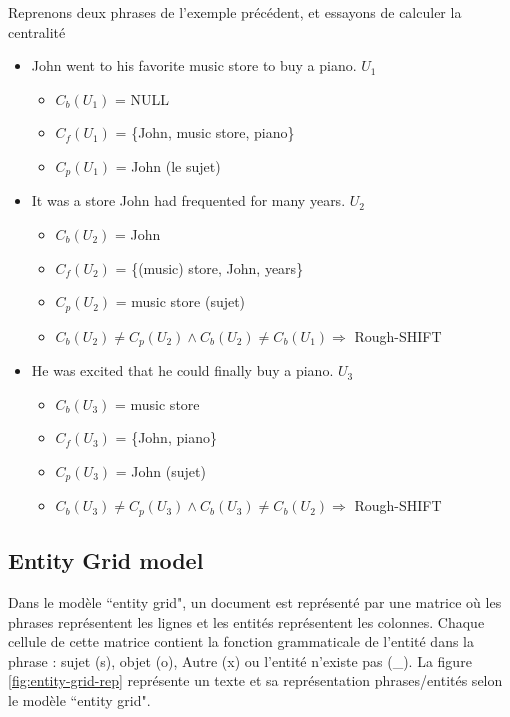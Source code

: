 \documentclass{KodeBook}
\begin{document}
Reprenons deux phrases de l'exemple précédent, et essayons de calculer la centralité
\begin{itemize}
	\item John went to his favorite music store to buy a piano. $U_1$
	\begin{itemize}
		\item $C_b(U_1)$ = NULL
		\item $C_f(U_1)$ = \{John, music store, piano\}
		\item $C_p(U_1)$ = John (le sujet)
	\end{itemize}
	\item It was a store John had frequented for many years. $U_2$
	\begin{itemize}
		\item $C_b(U_2)$ = John
		\item $C_f(U_2)$ = \{(music) store, John, years\}
		\item $C_p(U_2)$ =  music store (sujet)
		\item $C_b(U_2) \ne C_p(U_2) \wedge C_b(U_2) \ne C_b(U_1) \Rightarrow$ Rough-SHIFT
	\end{itemize}
	\item He was excited that he could finally buy a piano. $U_3$
	\begin{itemize}
		\item $C_b(U_3)$ = music store
		\item $C_f(U_3)$ = \{John, piano\}
		\item $C_p(U_3)$ =  John (sujet)
		\item $C_b(U_3) \ne C_p(U_3) \wedge C_b(U_3) \ne C_b(U_2) \Rightarrow$ Rough-SHIFT
	\end{itemize}
\end{itemize}


\subsection{Entity Grid model}

Dans le modèle ``entity grid", un document est représenté par une matrice où les phrases représentent les lignes et les entités représentent les colonnes. 
Chaque cellule de cette matrice contient la fonction grammaticale de l'entité dans la phrase : sujet (s), objet (o), Autre (x) ou l'entité n'existe pas (\_). 
La figure \ref{fig:entity-grid-rep} représente un texte et sa représentation phrases/entités selon le modèle ``entity grid". 
\end{document}
